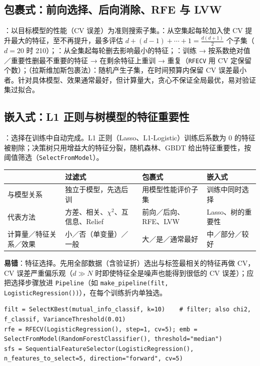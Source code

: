 \subsection{包裹式：前向选择、后向消除、RFE 与 LVW}
：以目标模型的性能（CV 误差）为准则搜索子集。：从空集起每轮加入使 CV 提升最大的特征，至不再提升，最多评估 $d+(d-1)+\cdots+1=\frac{d(d+1)}2$ 个子集（$d=20$ 时 210）；：从全集起每轮删去影响最小的特征；：训练 → 按系数绝对值／重要性删最不重要的特征 → 在剩余特征上重训 → 重复（\texttt{RFECV} 用 CV 定保留个数）；（拉斯维加斯包裹法）：随机产生子集，在时间预算内保留 CV 误差最小者。针对具体模型、效果通常最好，但计算量大，贪心不保证全局最优，易对验证集过拟合。

\subsection{嵌入式：L1 正则与树模型的特征重要性}
：选择在训练中自动完成。L1 正则（Lasso、L1-Logistic）训练后系数为 0 的特征被剔除；决策树只用增益大的特征分裂，随机森林、GBDT 给出特征重要性，按阈值筛选（\texttt{SelectFromModel}）。
\begin{center}\small\renewcommand{\arraystretch}{1.1}
\begin{tabularx}{\linewidth}{@{}p{3.6cm}LLL@{}}
\toprule
 & 过滤式 & 包裹式 & 嵌入式 \\
\midrule
与模型关系 & 独立于模型，先选后训 & 用模型性能评价子集 & 训练中同时选择 \\
代表方法 & 方差、相关、$\chi^2$、互信息、Relief & 前向／后向、RFE、LVW & Lasso、树的重要性 \\
计算量／特征关系／效果 & 小／否（单变量）／一般 & 大／是／通常最好 & 中／部分／较好 \\
\bottomrule
\end{tabularx}
\end{center}
\noindent\textbf{易错}：特征选择。先用全部数据（含验证折）选出与标签最相关的特征再做 CV，CV 误差严重偏乐观（$d\gg N$ 时即使特征全是噪声也能得到很低的 CV 误差）；应把选择步骤放进 \texttt{Pipeline}（如 \texttt{make\_pipeline(filt, LogisticRegression())}），在每个训练折内单独选。
\begin{lstlisting}[basicstyle=\ttfamily\footnotesize]
filt = SelectKBest(mutual_info_classif, k=10)    # filter; also chi2, f_classif, VarianceThreshold(0.01)
rfe = RFECV(LogisticRegression(), step=1, cv=5); emb = SelectFromModel(RandomForestClassifier(), threshold="median")
sfs = SequentialFeatureSelector(LogisticRegression(), n_features_to_select=5, direction="forward", cv=5)
\end{lstlisting}
